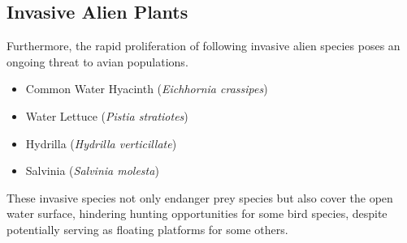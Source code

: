 \subsection{Invasive Alien Plants}
Furthermore, the rapid proliferation of following invasive alien species poses an ongoing threat to avian populations.

\begin{itemize}
\item Common Water Hyacinth (\textit{Eichhornia crassipes})
\item Water Lettuce (\textit{Pistia stratiotes})
\item Hydrilla (\textit{Hydrilla verticillate})
\item Salvinia (\textit{Salvinia molesta})
\end{itemize}
These invasive species not only endanger prey species but also cover the open water surface, hindering hunting opportunities for some bird species, despite potentially serving as floating platforms for some others.
